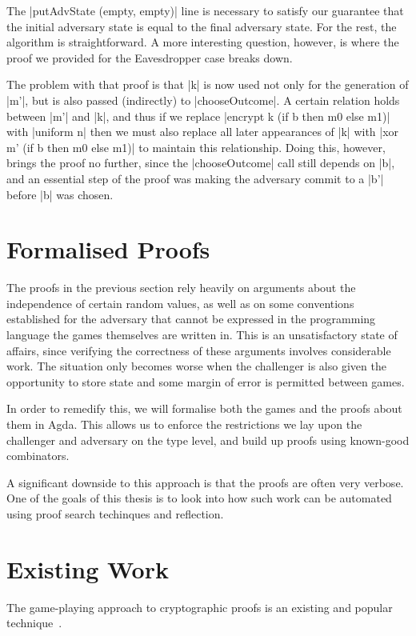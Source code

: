 The |putAdvState (empty, empty)| line is necessary to satisfy our guarantee that the initial adversary state is equal to
the final adversary state.  For the rest, the algorithm is straightforward.  A more interesting question, however, is
where the proof we provided for the Eavesdropper case breaks down.

The problem with that proof is that |k| is now used not only for the generation of |m'|, but is also passed (indirectly)
to |chooseOutcome|.  A certain relation holds between |m'| and |k|, and thus if we replace |encrypt k (if b then m0 else
m1)| with |uniform n| then we must also replace all later appearances of |k| with |xor m' (if b then m0 else m1)| to
maintain this relationship.  Doing this, however, brings the proof no further, since the |chooseOutcome| call still
depends on |b|, and an essential step of the proof was making the adversary commit to a |b'| before |b| was chosen.

\section{Formalised Proofs}

The proofs in the previous section rely heavily on arguments about the independence of certain random values, as well as
on some conventions established for the adversary that cannot be expressed in the programming language the games
themselves are written in.  This is an unsatisfactory state of affairs, since verifying the correctness of these
arguments involves considerable work.  The situation only becomes worse when the challenger is also given the
opportunity to store state and some margin of error is permitted between games.

In order to remedify this, we will formalise both the games and the proofs about them in Agda.  This allows us to
enforce the restrictions we lay upon the challenger and adversary on the type level, and build up proofs using
known-good combinators.

A significant downside to this approach is that the proofs are often very verbose.  One of the goals of this thesis is
to look into how such work can be automated using proof search techinques and reflection.

\section{Existing Work}

The game-playing approach to cryptographic proofs is an existing and popular technique~\cite{codebasedgames}.

